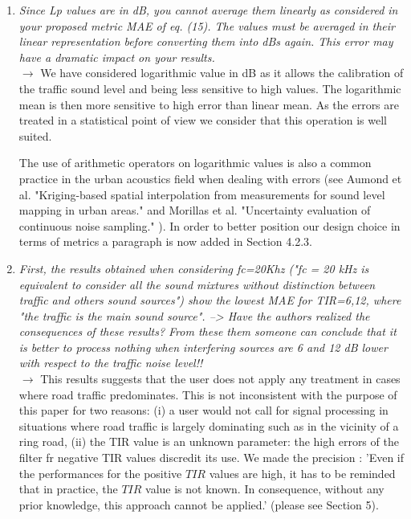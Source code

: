 \documentclass[10pt]{article}
\begin{document}
\begin{enumerate}
\item \emph{Since Lp values are in dB, you cannot average them linearly as considered in your proposed metric MAE of eq. (15). The values must be averaged in their linear representation before converting them into dBs again. This error may have a dramatic impact on your results.}\\
$\rightarrow$ We have considered logarithmic value in dB as it allows the calibration of the traffic sound level and being less sensitive to high values.
The logarithmic mean is then more sensitive to high error than linear mean. As the errors are treated in a statistical point of view we consider that this operation is well suited.

The use of arithmetic operators on logarithmic values is also a common practice in the urban acoustics field when dealing with errors (see Aumond et al. "Kriging-based spatial interpolation from measurements for sound level mapping in urban areas." \cite{aumond2018kriging}  and Morillas et al. "Uncertainty evaluation of continuous noise sampling." \cite{morillas2014uncertainty}). In order to  better position our design choice in terms of metrics a paragraph is now added in Section 4.2.3. %

\item \emph{First, the results obtained when considering fc=20Khz ("fc = 20 kHz is equivalent to consider all the sound mixtures without distinction between traffic and others sound sources") show the lowest MAE for TIR={6,12}, where "the traffic is the main sound source".
--> Have the authors realized the consequences of these results? From these them someone can conclude that it is better to process nothing when interfering sources are 6 and 12 dB lower with respect to the traffic noise level!!}\\
$\rightarrow$ This results suggests that the user does not apply any treatment in cases where road traffic predominates. This is not inconsistent with the purpose of this paper for two reasons: (i) a user would not call for signal processing in situations where road traffic is largely dominating such as in the vicinity of a ring road, (ii) the TIR value is an unknown parameter: the high errors of the filter fr negative TIR values discredit its use. We made the precision :
'Even if the performances for the positive $TIR$ values are high, it has to be reminded that in practice, the $TIR$ value is not known. In consequence, without any prior knowledge, this approach cannot be applied.' (please see Section 5).




\end{enumerate}
\end{document}
